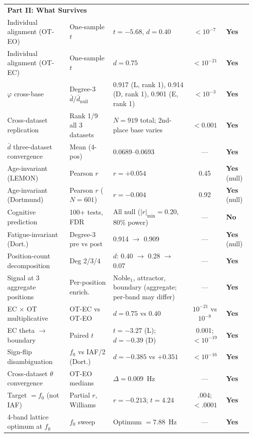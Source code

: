 \documentclass[11pt,a4paper]{article}
\newcommand{\phisym}{\varphi}
\newcommand{\fzero}{f_0}
\begin{document}
\begin{longtable}{p{4cm}p{3.5cm}p{2.5cm}cl}
\midrule
\multicolumn{5}{l}{\textbf{Part II: What Survives}} \\
Individual alignment (OT-EO) & One-sample $t$ & $t = -5.68$, $d = 0.40$ & $< 10^{-7}$ & \textbf{Yes} \\
Individual alignment (OT-EC) & One-sample $t$ & $d = 0.75$ & $< 10^{-21}$ & \textbf{Yes} \\
$\phisym$ cross-base & Degree-3 $\bar{d}/\bar{d}_{\text{null}}$ & 0.917 (L, rank 1), 0.914 (D, rank 1), 0.901 (E, rank 1) & $< 10^{-3}$ & \textbf{Yes} \\
Cross-dataset replication & Rank 1/9 all 3 datasets & $N = 919$ total; 2nd-place base varies & $< 0.001$ & \textbf{Yes} \\
$\bar{d}$ three-dataset convergence & Mean (4-pos) & 0.0689--0.0693 & --- & \textbf{Yes} \\
Age-invariant (LEMON) & Pearson $r$ & $r = +0.054$ & 0.45 & \textbf{Yes} (null) \\
Age-invariant (Dortmund) & Pearson $r$ ($N = 601$) & $r = -0.004$ & 0.92 & \textbf{Yes} (null) \\
Cognitive prediction & 100+ tests, FDR & All null ($|r|_{\min} = 0.20$, 80\% power) & --- & \textbf{No} \\
Fatigue-invariant (Dort.) & Degree-3 pre vs post & 0.914 $\to$ 0.909 & --- & \textbf{Yes} (null) \\
Position-count decomposition & Deg 2/3/4 & $d$: 0.40 $\to$ 0.28 $\to$ 0.07 & --- & \textbf{Yes} \\
Signal at 3 aggregate positions & Per-position enrich. & Noble$_1$, attractor, boundary (aggregate; per-band may differ) & --- & \textbf{Yes} \\
EC $\times$ OT multiplicative & OT-EC vs OT-EO & $d = 0.75$ vs $0.40$ & $10^{-21}$ vs $10^{-8}$ & \textbf{Yes} \\
EC theta $\to$ boundary & Paired $t$ & $t = -3.27$ (L); $d = -0.39$ (D) & 0.001; $< 10^{-19}$ & \textbf{Yes} \\
Sign-flip disambiguation & $\fzero$ vs IAF/2 (Dort.) & $d = -0.385$ vs $+0.351$ & $< 10^{-16}$ & \textbf{Yes} \\
Cross-dataset $\theta$ convergence & OT-EO medians & $\Delta = 0.009$~Hz & --- & \textbf{Yes} \\
Target $= \fzero$ (not IAF) & Partial $r$, Williams & $r = -0.213$; $t = 4.24$ & .004; $< .0001$ & \textbf{Yes} \\
4-band lattice optimum at $\fzero$ & $\fzero$ sweep & Optimum $= 7.88$~Hz & --- & \textbf{Yes} \\

\end{longtable}
\end{document}
